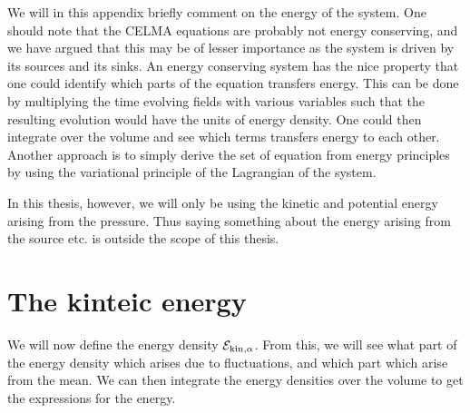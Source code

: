 We will in this appendix briefly comment on the energy of the system.
One should note that the CELMA equations are probably not energy conserving, and we have argued that this may be of lesser importance as the system is driven by its sources and its sinks.
An energy conserving system has the nice property that one could identify which parts of the equation transfers energy.
This can be done by multiplying the time evolving fields with various variables such that the resulting evolution would have the units of energy density.
One could then integrate over the volume and see which terms transfers energy to each other.
Another approach is to simply derive the set of equation from energy principles by using the variational principle of the Lagrangian of the system.

In this thesis, however, we will only be using the kinetic and potential energy arising from the pressure.
Thus saying something about the energy arising from the source etc. is outside the scope of this thesis.

\section{The kinteic energy}
%
We will now define the energy density $\mathcal{E}_{\text{kin},\alpha}$.
From this, we will see what part of the energy density which arises due to fluctuations, and which part which arise from the mean.
We can then integrate the energy densities over the volume to get the expressions for the energy.

